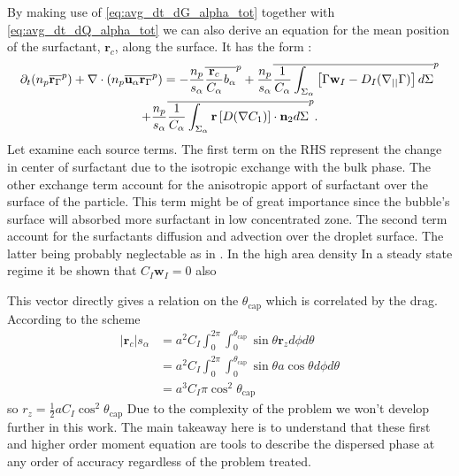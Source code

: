 By making use of \ref{eq:avg_dt_dG_alpha_tot} together with \ref{eq:avg_dt_dQ_alpha_tot} we can also derive an equation for the mean position of the surfactant, $\textbf{r}_c$, along the surface. 
It has the form :
\begin{multline}
    \partial_t (n_p\overline{\textbf{r}_\Gamma}^{p})
    + \mathbf{\nabla} \cdot (n_p\overline{\textbf{u}_\alpha\textbf{r}_\Gamma}^{p})
    =
    - \frac{n_p}{s_\alpha}\overline{\frac{\textbf{r}_c}{C_\alpha}b_\alpha}^{p}
    + \frac{n_p}{s_\alpha}\overline{
        \frac{1}{C_\alpha}
        \int_{\Sigma_\alpha} \left[
        \Gamma \textbf{w}_I
        - D_I (\mathbf{\nabla}_{||} \Gamma)
    \right] d\Sigma}^{p}\\
    + \frac{n_p}{s_\alpha}\overline{
    \frac{1}{C_\alpha}
    \int_{\Sigma_\alpha} \textbf{r} \left[
        D(\mathbf{\nabla} C_1)
    \right]\cdot \textbf{n}_2  d\Sigma}^{p}.
    \label{eq:avg_dt_dG_alpha_tot}
\end{multline}
Let examine each source terms. 
The first term on the RHS represent the change in center of surfactant due to the isotropic exchange with the bulk phase. 
The other exchange term account for the anisotropic apport of surfactant over the surface of the particle.
This term might be of great importance since the bubble's surface will absorbed more surfactant in low concentrated zone.  
The second term account for the surfactants diffusion and advection over the droplet surface. 
The latter being probably neglectable as in \citet{kentheswaran2022direct}. 
In the high area density 
In a steady state regime it be shown that $C_I \textbf{w}_I = 0$ also 



This vector directly gives a relation on the $\theta_\text{cap}$ which is correlated by the drag. 
According to the scheme
\begin{align*}
    |\textbf{r}_c| s_\alpha
    &=a^2 C_I \int_{0}^{2\pi} \int_{0}^{\theta_\text{cap}}  \sin\theta \textbf{r}_z d\phi d\theta\\
    &=a^2 C_I \int_{0}^{2\pi} \int_{0}^{\theta_\text{cap}}  \sin\theta a \cos\theta d\phi d\theta\\
    &=a^3 C_I \pi \cos^2{\theta_\text{cap}}
\end{align*}
so $r_z = \frac{1}{2}a C_I \cos^2{\theta_\text{cap}}$
Due to the complexity of the problem we won't develop further in this work. 
The main takeaway here is to understand that these first and higher order moment equation are tools to describe the dispersed phase at any order of accuracy regardless of the problem treated. 

